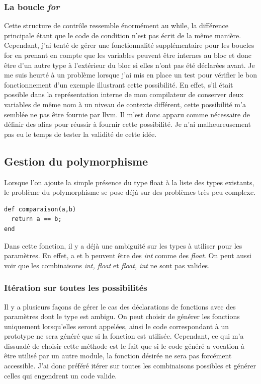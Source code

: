 \documentclass[12pt]{article}
\begin{document}
\subsubsection{La boucle \em{for}}
Cette structure de contrôle ressemble énormément au while, la différence
principale étant que le code de condition n'est pas écrit de la même manière.
Cependant, j'ai tenté de gérer une fonctionnalité supplémentaire pour les boucles
for en prenant en compte que les variables peuvent être internes au bloc et donc
être d'un autre type à l'extérieur du bloc si elles n'ont pas été déclarées
avant. Je me suis heurté à un problème lorsque j'ai mis en place un test pour
vérifier le bon fonctionnement d'un exemple illustrant cette possibilité. En
effet, s'il était possible dans la représentation interne de mon compilateur de
conserver deux variables de même nom à un niveau de contexte différent, cette
possibilité m'a semblée ne pas être fournie par llvm. Il m'est donc apparu comme
nécessaire de définir des alias pour réussir à fournir cette possibilité. Je
n'ai malheureusement pas eu le temps de tester la validité de cette idée.

\subsection{Gestion du polymorphisme}
Lorsque l'on ajoute la simple présence du type float à la liste des types
existants, le problème du polymorphisme se pose déjà sur des problèmes très
peu complexe.
\begin{lstlisting}
def comparaison(a,b)
  return a == b;
end
\end{lstlisting}
Dans cette fonction, il y a déjà une ambiguité sur les types à utiliser pour
les paramètres. En effet, a et b peuvent être des {\em int} comme des
{\em float}. On peut aussi voir que les combinaisons {\em int, float} et 
{\em float, int} ne sont pas valides.

\subsubsection{Itération sur toutes les possibilités}
Il y a plusieurs façons de gérer le cas des déclarations de fonctions avec des
paramètres dont le type est ambigu. On peut choisir de générer les fonctions
uniquement lorsqu'elles seront appelées, ainsi le code correspondant à un
prototype ne sera généré que si la fonction est utilisée. Cependant, ce qui
m'a dissuadé de choisir cette méthode est le fait que si le code généré a
vocation à être utilisé par un autre module, la fonction désirée ne sera pas
forcément accessible. J'ai donc préféré itérer sur toutes les combinaisons
possibles et générer celles qui engendrent un code valide.\\
\end{document}
